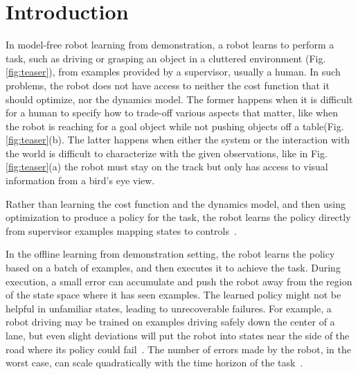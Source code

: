 \documentclass[10pt, conference]{ieeeconf}      %
\begin{document}

\section{Introduction} 


In model-free robot learning from demonstration, a robot learns to perform a task, such as driving or grasping an object in a cluttered environment (Fig. \ref{fig:teaser}), from examples provided by a  supervisor, usually a human.  In such problems, the robot does not have access to neither the cost function that it should optimize, nor the dynamics model. The former happens when it is difficult for a human to specify how to trade-off various aspects that matter, like when the robot is reaching for a goal object while not pushing objects off a table(Fig. \ref{fig:teaser}(b).  The latter happens when either the system or the interaction with the world is difficult to characterize with the given observations, like in Fig. \ref{fig:teaser}(a) the robot must stay on the track but only has access to visual information from a bird's eye view. 

Rather than learning the cost function and the dynamics model, and then using optimization to produce a policy for the task, the robot learns the policy directly from supervisor examples mapping states to controls~\cite{argall2009survey}.






In the offline learning from demonstration setting, the robot learns the policy based on a batch of examples, and then executes it to achieve the task.  During execution, a small error can accumulate and push the robot away from the region of the state space where it has seen examples. The learned policy might not be helpful in unfamiliar states, leading to unrecoverable failures.  For example, a robot driving may be trained on examples driving safely down the center of a lane, but even slight deviations will put the robot into states near the side of the road where its policy could  fail~\cite{pomerleau1989alvinn}. The number of errors made by the robot, in the worst case,  can scale quadratically with the time horizon of the task~\cite{ross2010efficient}.
\end{document}
